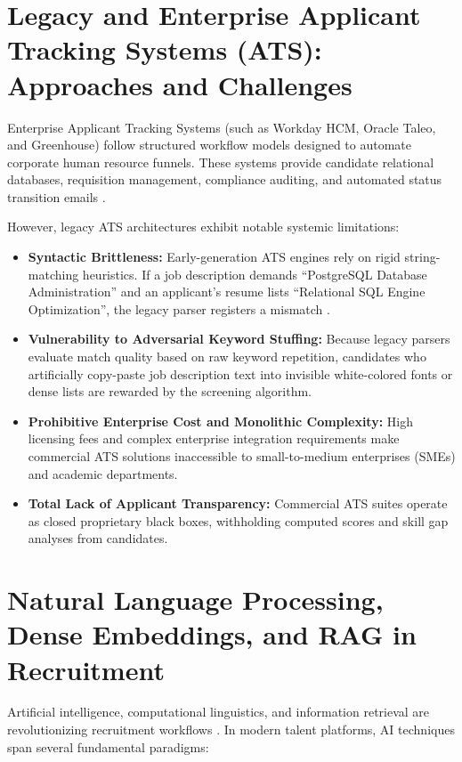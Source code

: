 \section{Legacy and Enterprise Applicant Tracking Systems (ATS): Approaches and Challenges}
Enterprise Applicant Tracking Systems (such as Workday HCM, Oracle Taleo, and Greenhouse) follow structured workflow models designed to automate corporate human resource funnels. These systems provide candidate relational databases, requisition management, compliance auditing, and automated status transition emails \cite{parasuraman2021ats}.

However, legacy ATS architectures exhibit notable systemic limitations:
\begin{itemize}
    \item \textbf{Syntactic Brittleness:} Early-generation ATS engines rely on rigid string-matching heuristics. If a job description demands ``PostgreSQL Database Administration'' and an applicant’s resume lists ``Relational SQL Engine Optimization'', the legacy parser registers a mismatch \cite{jain2020ats}.
    \item \textbf{Vulnerability to Adversarial Keyword Stuffing:} Because legacy parsers evaluate match quality based on raw keyword repetition, candidates who artificially copy-paste job description text into invisible white-colored fonts or dense lists are rewarded by the screening algorithm.
    \item \textbf{Prohibitive Enterprise Cost and Monolithic Complexity:} High licensing fees and complex enterprise integration requirements make commercial ATS solutions inaccessible to small-to-medium enterprises (SMEs) and academic departments.
    \item \textbf{Total Lack of Applicant Transparency:} Commercial ATS suites operate as closed proprietary black boxes, withholding computed scores and skill gap analyses from candidates.
\end{itemize}

\section{Natural Language Processing, Dense Embeddings, and RAG in Recruitment}
Artificial intelligence, computational linguistics, and information retrieval are revolutionizing recruitment workflows \cite{roy2020resume, chen2018resume}. In modern talent platforms, AI techniques span several fundamental paradigms:

